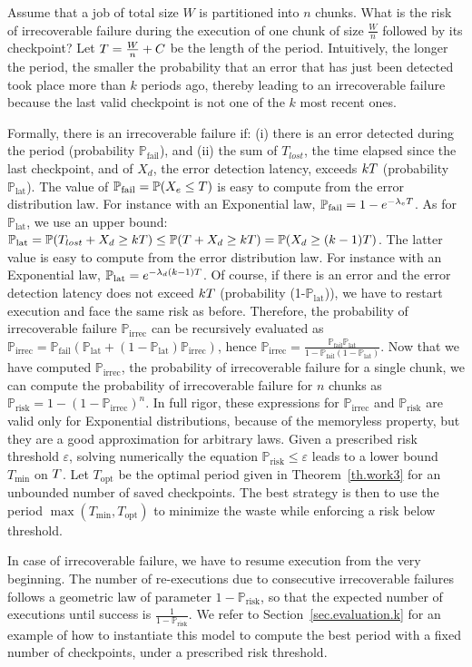 \documentclass[10pt,table]{article}
\newcommand{\ema}[1]{\ensuremath{#1}\xspace}
\newcommand{\Xlost}{\ema{T_{lost}}}
\newcommand{\WWW}{\ema{W}}
\newcommand{\lambdae}{\ema{\lambda_{e}}}
\newcommand{\lambdad}{\ema{\lambda_{d}}}
\newcommand{\ccc}{\ema{C}}
\newcommand{\Tmin}{\ensuremath{T_{\min}}\xspace}
\newcommand{\Pfa}{\ema{\mathbb{P}_{\text{fail}}}}
\newcommand{\Pfb}{\ema{\mathbb{P}_{\text{lat}}}}
\newcommand{\Pfc}{\ema{\mathbb{P}_{\text{irrec}}}}
\newcommand{\Pfd}{\ema{\mathbb{P}_{\text{risk}}}}
\newcommand{\risky}{\ema{\varepsilon}}
\newcommand{\Topt}{\ema{T_{\text{opt}}}}
\begin{document}
Assume that a job of total size \WWW is partitioned into $n$ chunks. 
What is the risk of irrecoverable failure during the execution of one chunk of size $\frac{\WWW}{n}$ followed by its checkpoint?
 Let $\T = \frac{\WWW}{n} + \ccc$ be the length of the period. Intuitively, the longer the period, 
 the smaller the probability that
an error that has just been detected took place more than $k$ periods ago, thereby leading to 
an irrecoverable failure because the last valid checkpoint is not one of the $k$ most recent ones. 

Formally, there is an irrecoverable failure if: 
(i) there is an error detected during the period (probability \Pfa),  and 
(ii) the sum of $\Xlost$, the time elapsed since the last checkpoint, and of  $X_{d}$, 
the error detection latency, exceeds  $kT$ (probability \Pfb). 
The value of $\Pfa = \PP(X_{e}\leq \T)$ is easy to compute from the error distribution law. For instance with an Exponential law, $\Pfa = 1 - e^{- \lambdae \T}$. As for \Pfb, we use an upper bound:
$\Pfb = \PP(\Xlost+X_{d}\geq k\T) \leq \PP(\T+X_{d}\geq k\T) = \PP(X_{d}\geq (k-1)\T) $. The latter
value is easy to compute from the error distribution law. For instance with an Exponential law, 
$\Pfb = e^{- \lambdad (k-1) \T}$. Of course, if there is an error and the error detection latency 
does not exceed  $kT$ (probability (1-\Pfb)), we have to restart execution and face the same risk as before.
Therefore, the probability of irrecoverable failure \Pfc can be recursively evaluated as
$\Pfc = \Pfa (\Pfb +  (1-\Pfb)  \Pfc)$, hence $\Pfc = \frac{\Pfa \Pfb}{1- \Pfa (1-\Pfb)}$. Now that we have computed \Pfc, the probability of irrecoverable  failure for a single chunk,
we can compute the probability of irrecoverable failure for  $n$ chunks as $\Pfd = 1 - (1 - \Pfc)^{n}$.
In full rigor,
these expressions for \Pfc and \Pfd are valid only for Exponential distributions, because of the memoryless property, but
they are a good approximation for arbitrary laws. Given a prescribed risk threshold $\risky$,
solving numerically the equation $\Pfd \leq \risky$ leads to a
lower bound $\Tmin$ on $T$. Let $\Topt$ be the optimal period given in Theorem~\ref{th.work3}
for an unbounded number of saved checkpoints. The best strategy is then to use the period $\max(\Tmin, \Topt)$ to minimize the waste while enforcing a risk below threshold. 

In case of irrecoverable  failure, we have to resume execution from the very beginning. The number of re-executions
due to consecutive irrecoverable  failures follows a geometric law of parameter $1-\Pfd$, so that the expected number of executions until success is $\frac{1}{1 - \Pfd}$.
We refer to Section~\ref{sec.evaluation.k} for an example of how to instantiate this model to
compute the best period with a fixed number of checkpoints, under a prescribed risk threshold.
\end{document}
